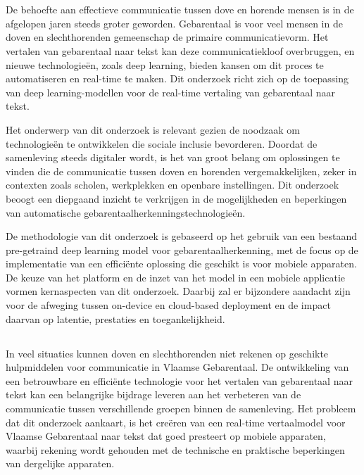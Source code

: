 
\chapter{}%
\label{ch:inleiding}

De behoefte aan effectieve communicatie tussen dove en horende mensen is in de afgelopen jaren steeds groter geworden. 
Gebarentaal is voor veel mensen in de doven en slechthorenden gemeenschap de primaire communicatievorm. 
Het vertalen van gebarentaal naar tekst kan deze communicatiekloof overbruggen, en nieuwe technologieën, zoals deep learning, bieden kansen om dit proces te automatiseren en real-time te maken. 
Dit onderzoek richt zich op de toepassing van deep learning-modellen voor de real-time vertaling van gebarentaal naar tekst.

Het onderwerp van dit onderzoek is relevant gezien de noodzaak om technologieën te ontwikkelen die sociale inclusie bevorderen. 
Doordat de samenleving steeds digitaler wordt, is het van groot belang om oplossingen te vinden die de communicatie tussen doven en horenden vergemakkelijken, zeker in contexten zoals scholen, werkplekken en openbare instellingen. 
Dit onderzoek beoogt een diepgaand inzicht te verkrijgen in de mogelijkheden en beperkingen van automatische gebarentaalherkenningstechnologieën.

De methodologie van dit onderzoek is gebaseerd op het gebruik van een bestaand pre-getraind deep learning model voor gebarentaalherkenning, met de focus op de implementatie van een efficiënte oplossing die geschikt is voor mobiele apparaten. 
De keuze van het platform en de inzet van het model in een mobiele applicatie vormen kernaspecten van dit onderzoek. 
Daarbij zal er bijzondere aandacht zijn voor de afweging tussen on-device en cloud-based deployment en de impact daarvan op latentie, prestaties en toegankelijkheid.

\section{}%
\label{sec:probleemstelling}

In veel situaties kunnen doven en slechthorenden niet rekenen op geschikte hulpmiddelen voor communicatie in Vlaamse Gebarentaal.
De ontwikkeling van een betrouwbare en efficiënte technologie voor het vertalen van gebarentaal naar tekst kan een belangrijke bijdrage leveren aan het verbeteren van de communicatie tussen verschillende groepen binnen de samenleving. 
Het probleem dat dit onderzoek aankaart, is het creëren van een real-time vertaalmodel voor Vlaamse Gebarentaal naar tekst dat goed presteert op mobiele apparaten, waarbij rekening wordt gehouden met de technische en praktische beperkingen van dergelijke apparaten.

